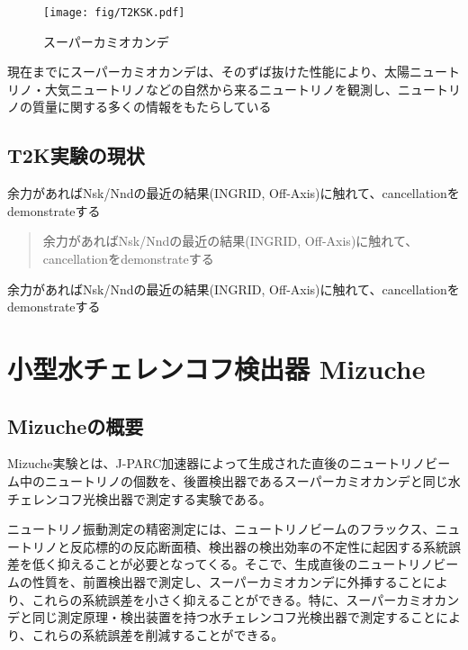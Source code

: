 \documentclass[11pt]{ltjsreport}
\begin{document}
\begin{figure}[!htb]
\centering
\texttt{[image: fig/T2KSK.pdf]}
\caption[スーパーカミオカンデ]{スーパーカミオカンデ}
\label{SuperKamiokande}
\end{figure}

現在までにスーパーカミオカンデは、そのずば抜けた性能により、太陽ニュートリノ・大気ニュートリノなどの自然から来るニュートリノを観測し、ニュートリノの質量に関する多くの情報をもたらしている

\section{T2K実験の現状}
余力があればNsk/Nndの最近の結果(INGRID, Off-Axis)に触れて、cancellationをdemonstrateする

\begin{quote}
余力があればNsk/Nndの最近の結果(INGRID, Off-Axis)に触れて、cancellationをdemonstrateする
\end{quote}

余力があればNsk/Nndの最近の結果(INGRID, Off-Axis)に触れて、cancellationをdemonstrateする
\fi

\chapter{小型水チェレンコフ検出器 Mizuche}

\section{Mizucheの概要}
Mizuche実験とは、J-PARC加速器によって生成された直後のニュートリノビーム中のニュートリノの個数を、後置検出器であるスーパーカミオカンデと同じ水チェレンコフ光検出器で測定する実験である。

ニュートリノ振動測定の精密測定には、ニュートリノビームのフラックス、ニュートリノと反応標的の反応断面積、検出器の検出効率の不定性に起因する系統誤差を低く抑えることが必要となってくる。そこで、生成直後のニュートリノビームの性質を、前置検出器で測定し、スーパーカミオカンデに外挿することにより、これらの系統誤差を小さく抑えることができる。特に、スーパーカミオカンデと同じ測定原理・検出装置を持つ水チェレンコフ光検出器で測定することにより、これらの系統誤差を削減することができる。
\end{document}
